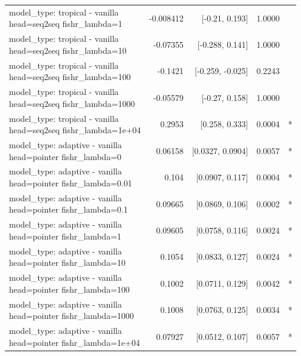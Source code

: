 \documentclass[10pt]{article}
\makeatletter
\newcommand{\stackcell}[1]{\begin{tabular}[t]{@{}l@{}}#1\end{tabular}}
\makeatother
\begin{document}
{\begin{longtable}{lrrrl}
\stackcell{model\_type: tropical - vanilla\\\footnotesize head=seq2seq fishr\_lambda=1 } & -0.008412 & [-0.21, 0.193] & 1.0000 & \\
\stackcell{model\_type: tropical - vanilla\\\footnotesize head=seq2seq fishr\_lambda=10 } & -0.07355 & [-0.288, 0.141] & 1.0000 & \\
\stackcell{model\_type: tropical - vanilla\\\footnotesize head=seq2seq fishr\_lambda=100 } & -0.1421 & [-0.259, -0.025] & 0.2243 & \\
\stackcell{model\_type: tropical - vanilla\\\footnotesize head=seq2seq fishr\_lambda=1000 } & -0.05579 & [-0.27, 0.158] & 1.0000 & \\
\stackcell{model\_type: tropical - vanilla\\\footnotesize head=seq2seq fishr\_lambda=1e+04 } & 0.2953 & [0.258, 0.333] & 0.0004 & *\\
\stackcell{model\_type: adaptive - vanilla\\\footnotesize head=pointer fishr\_lambda=0 } & 0.06158 & [0.0327, 0.0904] & 0.0057 & *\\
\stackcell{model\_type: adaptive - vanilla\\\footnotesize head=pointer fishr\_lambda=0.01 } & 0.104 & [0.0907, 0.117] & 0.0004 & *\\
\stackcell{model\_type: adaptive - vanilla\\\footnotesize head=pointer fishr\_lambda=0.1 } & 0.09665 & [0.0869, 0.106] & 0.0002 & *\\
\stackcell{model\_type: adaptive - vanilla\\\footnotesize head=pointer fishr\_lambda=1 } & 0.09605 & [0.0758, 0.116] & 0.0024 & *\\
\stackcell{model\_type: adaptive - vanilla\\\footnotesize head=pointer fishr\_lambda=10 } & 0.1054 & [0.0833, 0.127] & 0.0024 & *\\
\stackcell{model\_type: adaptive - vanilla\\\footnotesize head=pointer fishr\_lambda=100 } & 0.1002 & [0.0711, 0.129] & 0.0042 & *\\
\stackcell{model\_type: adaptive - vanilla\\\footnotesize head=pointer fishr\_lambda=1000 } & 0.1008 & [0.0763, 0.125] & 0.0034 & *\\
\stackcell{model\_type: adaptive - vanilla\\\footnotesize head=pointer fishr\_lambda=1e+04 } & 0.07927 & [0.0512, 0.107] & 0.0057 & *\\

\end{longtable}}
\end{document}
